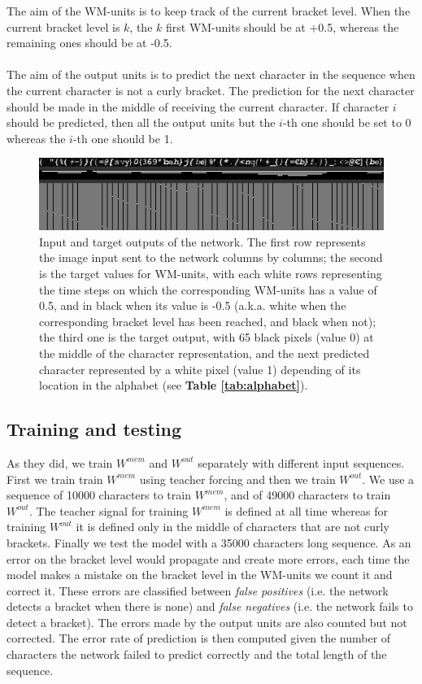 The aim of the WM-units is to keep track of the current bracket level. When the current bracket level is $\mathit{k}$, the $\mathit{k}$ first WM-units should be at +0.5, whereas the remaining ones should be at -0.5. \\
\\
The aim of the output units is to predict the next character in the sequence when the current character is not a curly bracket.
The prediction for the next character should be made in the middle of receiving the current character. If character $i$ should be predicted, then all the output units but the $i$-th one should be set to 0 whereas the $i$-th one should be 1. \\

\begin{figure}[h]
    \centering
    \includegraphics[width = \linewidth]{data/Sequence_img.png}
    \caption{Input and target outputs of the network. The first row represents the image input sent to the network columns by columns; the second is the target values for WM-units, with each white rows representing the time steps on which the corresponding WM-units has a value of 0.5, and in black when its value is -0.5 (a.k.a. white when the corresponding bracket level has been reached, and black when not); the third one is the target output, with 65 black pixels (value 0) at the middle of the character representation, and the next predicted character represented by a white pixel (value 1) depending of its location in the alphabet (see \textbf{Table \ref{tab:alphabet}}).}
    \label{fig:archi tecture}
\end{figure}

\subsection{Training and testing}

As they did, we train $W^{mem}$ and $W^{out}$ separately with different input sequences.
First we train train $W^{mem}$ using teacher forcing and then we train $W^{out}$.
We use a sequence of 10000 characters to train $W^{mem}$, and of 49000 characters to train $W^{out}$.
The teacher signal for training $W^{mem}$ is defined at all time whereas for training $W^{out}$ it is defined only in the middle of characters that are not curly brackets.
Finally we test the model with a 35000 characters long sequence.
As an error on the bracket level would propagate and create more errors, each time the model makes a mistake on the bracket level in the WM-units we count it and correct it.
These errors are classified between \textit{false positives} (i.e. the network detects a bracket when there is none) and \textit{false negatives} (i.e. the network fails to detect a bracket).
The errors made by the output units are also counted but not corrected. The error rate of prediction is then computed given the number of characters the network failed to predict correctly and the total length of the sequence.

